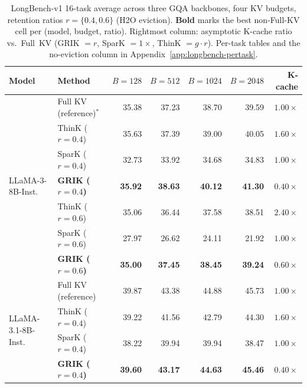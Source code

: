 \documentclass{article}
\begin{document}
\begin{table}[t!]
\centering
\small
\setlength{\tabcolsep}{4pt}
\renewcommand{\arraystretch}{1.10}
\caption{LongBench-v1 16-task average across three GQA backbones, four KV budgets, retention ratios $r{=}\{0.4, 0.6\}$ (H2O eviction). \textbf{Bold} marks the best non-Full-KV cell per (model, budget, ratio). Rightmost column: asymptotic K-cache ratio vs.\ Full~KV (GRIK $= r$, SparK $= 1{\times}$, ThinK $= g{\cdot}r$). Per-task tables and the no-eviction column in Appendix~\ref{app:longbench-pertask}.}
\label{tab:main_avg}
\begin{tabular}{llrrrrr}
\toprule
Model & Method & $B{=}128$ & $B{=}512$ & $B{=}1024$ & $B{=}2048$ & K-cache \\
\midrule
\multirow{7}{*}{LLaMA-3-8B-Inst.}
& Full KV (reference)$^\ast$            & 35.38          & 37.23          & 38.70          & 39.59          & $1.00\times$ \\
\cmidrule(lr){2-7}
& ThinK ($r{=}0.4$)            & 35.63          & 37.39          & 39.00          & 40.05          & $1.60\times$ \\
& SparK ($r{=}0.4$)                      & 32.73          & 33.92          & 34.68          & 34.83          & $1.00\times$ \\
& \textbf{GRIK ($r{=}0.4$)}              & \textbf{35.92} & \textbf{38.63} & \textbf{40.12} & \textbf{41.30} & $\mathbf{0.40\times}$ \\
\cmidrule(lr){2-7}
& ThinK ($r{=}0.6$)            & 35.06          & 36.44          & 37.58          & 38.51          & $2.40\times$ \\
& SparK ($r{=}0.6$)                      & 27.97          & 26.62          & 24.11          & 21.92          & $1.00\times$ \\
& \textbf{GRIK ($r{=}0.6$)}              & \textbf{35.00} & \textbf{37.45} & \textbf{38.45} & \textbf{39.24} & $\mathbf{0.60\times}$ \\
\midrule
\multirow{7}{*}{LLaMA-3.1-8B-Inst.}
& Full KV (reference)                    & 39.87          & 43.38          & 44.88          & 45.73          & $1.00\times$ \\
\cmidrule(lr){2-7}
& ThinK ($r{=}0.4$)                      & 39.22          & 41.56          & 42.79          & 44.30          & $1.60\times$ \\
& SparK ($r{=}0.4$)                      & 38.22          & 39.94          & 39.94          & 38.47          & $1.00\times$ \\
& \textbf{GRIK ($r{=}0.4$)}              & \textbf{39.60} & \textbf{43.17} & \textbf{44.63} & \textbf{45.46} & $\mathbf{0.40\times}$ \\

\end{tabular}
\end{table}
\end{document}
